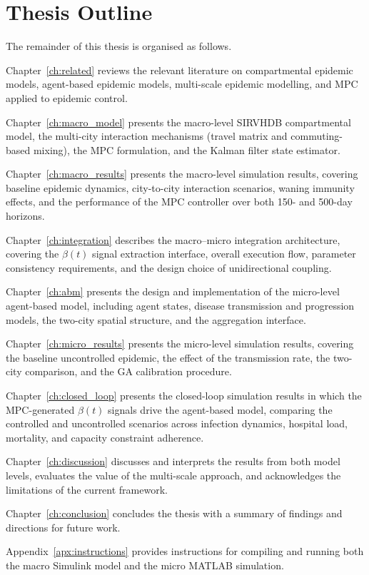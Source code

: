 \section{Thesis Outline}
\label{sec:outline}

The remainder of this thesis is organised as follows.

Chapter~\ref{ch:related} reviews the relevant literature on compartmental epidemic models, agent-based epidemic models, multi-scale epidemic modelling, and MPC applied to epidemic control.

Chapter~\ref{ch:macro_model} presents the macro-level SIRVHDB compartmental model, the multi-city interaction mechanisms (travel matrix and commuting-based mixing), the MPC formulation, and the Kalman filter state estimator.

Chapter~\ref{ch:macro_results} presents the macro-level simulation results, covering baseline epidemic dynamics, city-to-city interaction scenarios, waning immunity effects, and the performance of the MPC controller over both 150- and 500-day horizons.

Chapter~\ref{ch:integration} describes the macro--micro integration architecture, covering the $\beta(t)$ signal extraction interface, overall execution flow, parameter consistency requirements, and the design choice of unidirectional coupling.

Chapter~\ref{ch:abm} presents the design and implementation of the micro-level agent-based model, including agent states, disease transmission and progression models, the two-city spatial structure, and the aggregation interface.

Chapter~\ref{ch:micro_results} presents the micro-level simulation results, covering the baseline uncontrolled epidemic, the effect of the transmission rate, the two-city comparison, and the GA calibration procedure.

Chapter~\ref{ch:closed_loop} presents the closed-loop simulation results in which the MPC-generated $\beta(t)$ signals drive the agent-based model, comparing the controlled and uncontrolled scenarios across infection dynamics, hospital load, mortality, and capacity constraint adherence.

Chapter~\ref{ch:discussion} discusses and interprets the results from both model levels, evaluates the value of the multi-scale approach, and acknowledges the limitations of the current framework.

Chapter~\ref{ch:conclusion} concludes the thesis with a summary of findings and directions for future work.

Appendix~\ref{apx:instructions} provides instructions for compiling and running both the macro Simulink model and the micro MATLAB simulation.
